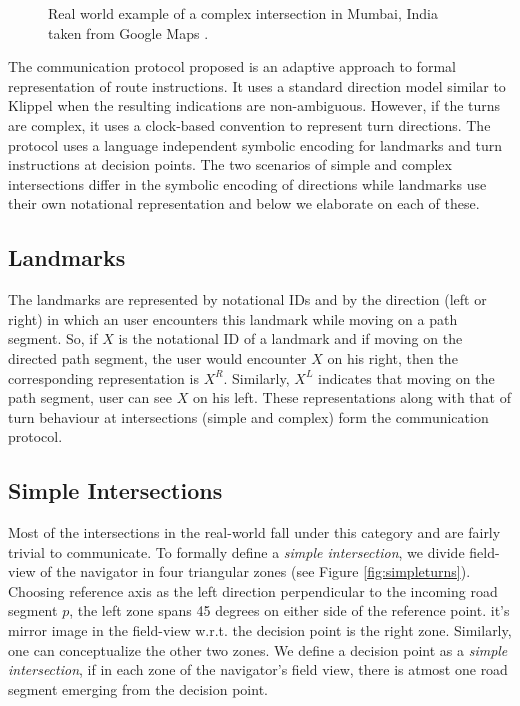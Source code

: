 \documentclass{iitkthesis}
\begin{document}
 \begin{figure}[htb]
\centering
\caption{Real world example of a complex intersection in Mumbai, India 
taken from Google Maps \cite{gmaps}.}
\label{fig:complex_real}
 \end{figure}

The communication protocol proposed is an adaptive approach to formal 
representation of route instructions. It uses a standard direction model 
similar to Klippel \cite{klippel} when the resulting indications are non-ambiguous. However, if the turns are complex, it uses a clock-based 
convention to represent turn directions. The protocol uses a language 
independent symbolic encoding for landmarks and turn instructions at 
decision points. The two scenarios of simple and complex intersections 
differ in the symbolic encoding of directions while landmarks use their own 
notational representation and below we elaborate on each of these. 

\subsection{Landmarks}
The landmarks are represented by notational IDs and by the direction 
(left or right) in which an user encounters this landmark while moving on 
a path segment. So, if $X$ is the notational ID of a landmark and if 
moving on the directed path segment, the user would encounter $X$ on his 
right, then the corresponding representation is $X^R$. Similarly, $X^L$ 
indicates that moving on the path segment, user can see $X$ on his left. 
These representations along with that of turn behaviour at intersections 
(simple and complex) form the communication protocol. 

\subsection{Simple Intersections}
Most of the intersections in the real-world fall under this category and 
are fairly trivial to communicate. To formally define a \textit{simple 
intersection}, we divide field-view of the navigator in four triangular 
zones (see Figure \ref{fig:simpleturns}). Choosing reference axis as the 
left direction perpendicular to the incoming road segment $p$, the left 
zone spans 45 degrees on either side of the reference point. it's mirror 
image in the field-view w.r.t. the decision point is the right zone. 
Similarly, one can conceptualize the other two zones. We define a 
decision point as a \textit{simple intersection}, if in each zone of the 
navigator's field view, there is atmost one road segment emerging from 
the decision point. 
\end{document}

